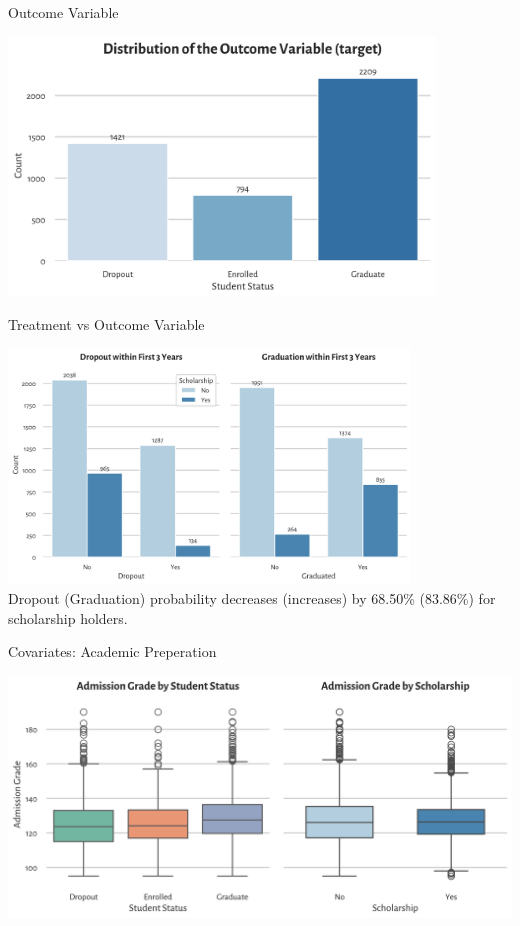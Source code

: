 \documentclass[aspectratio=169]{beamer}
\begin{document}
\begin{frame}{Outcome Variable}
	\begin{center}
     \includegraphics[width=0.85\textwidth]{Tex_Pictures/Graph1.png}
     \end{center}
\end{frame}

\begin{frame}{Treatment vs Outcome Variable}
	\begin{center}
     \includegraphics[width=0.8\textwidth]{Tex_Pictures/Graph2.png} \\
     \small
     Dropout (Graduation) probability decreases (increases) by 68.50\% (83.86\%) for scholarship holders.
     \end{center}
\end{frame}

\begin{frame}{Covariates: Academic Preperation}
	\begin{center}
     \includegraphics[width=1\textwidth]{Tex_Pictures/Graph_admission_grade.png} \\
     \end{center}
\end{frame}
\end{document}
